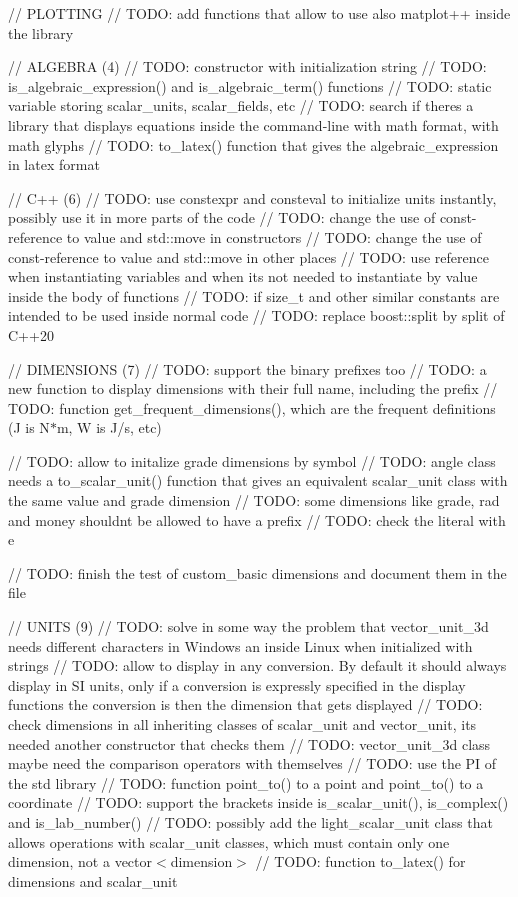 // PLOTTING // TODO\+: add functions that allow to use also matplot++ inside the library

// ALGEBRA (4) // TODO\+: constructor with initialization string // TODO\+: is\+\_\+algebraic\+\_\+expression() and is\+\_\+algebraic\+\_\+term() functions // TODO\+: static variable storing scalar\+\_\+units, scalar\+\_\+fields, etc // TODO\+: search if there\textquotesingle{}s a library that displays equations inside the command-\/line with math format, with math glyphs // TODO\+: to\+\_\+latex() function that gives the algebraic\+\_\+expression in latex format

// C++ (6) // TODO\+: use constexpr and consteval to initialize units instantly, possibly use it in more parts of the code // TODO\+: change the use of const-\/reference to value and std\+::move in constructors // TODO\+: change the use of const-\/reference to value and std\+::move in other places // TODO\+: use reference when instantiating variables and when it\textquotesingle{}s not needed to instantiate by value inside the body of functions // TODO\+: if size\+\_\+t and other similar constants are intended to be used inside normal code // TODO\+: replace boost\+::split by split of C++20

// DIMENSIONS (7) // TODO\+: support the binary prefixes too // TODO\+: a new function to display dimensions with their full name, including the prefix // TODO\+: function get\+\_\+frequent\+\_\+dimensions(), which are the frequent definitions (J is N\texorpdfstring{$\ast$}{*}m, W is J/s, etc)

// TODO\+: allow to initalize grade dimensions by symbol // TODO\+: angle class needs a to\+\_\+scalar\+\_\+unit() function that gives an equivalent scalar\+\_\+unit class with the same value and grade dimension // TODO\+: some dimensions like grade, rad and money shouldn\textquotesingle{}t be allowed to have a prefix // TODO\+: check the literal with e

// TODO\+: finish the test of custom\+\_\+basic dimensions and document them in the  file

// UNITS (9) // TODO\+: solve in some way the problem that vector\+\_\+unit\+\_\+3d needs different characters in Windows an inside Linux when initialized with strings // TODO\+: allow to display in any conversion. By default it should always display in SI units, only if a conversion is expressly specified in the display functions the conversion is then the dimension that gets displayed // TODO\+: check dimensions in all inheriting classes of scalar\+\_\+unit and vector\+\_\+unit, it\textquotesingle{}s needed another constructor that checks them // TODO\+: vector\+\_\+unit\+\_\+3d class maybe need the comparison operators with themselves // TODO\+: use the PI of the std library // TODO\+: function point\+\_\+to() to a point and point\+\_\+to() to a coordinate // TODO\+: support the brackets inside is\+\_\+scalar\+\_\+unit(), is\+\_\+complex() and is\+\_\+lab\+\_\+number() // TODO\+: possibly add the light\+\_\+scalar\+\_\+unit class that allows operations with scalar\+\_\+unit classes, which must contain only one dimension, not a vector$<$dimension$>$ // TODO\+: function to\+\_\+latex() for dimensions and scalar\+\_\+unit

